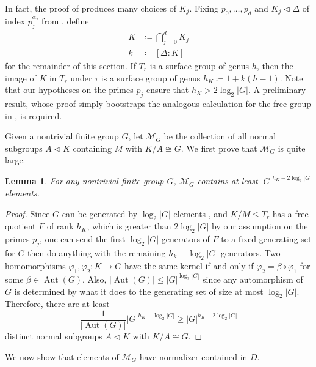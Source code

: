 \documentclass[11pt]{article}
\theoremstyle{plain}
\newtheorem{lem}[thm]{Lemma}
\theoremstyle{definition}
\theoremstyle{remark}
\newcommand{\calM}{\mathcal{M}}
\newcommand{\al}{\alpha}
\newcommand{\Del}{\Delta}
\DeclareMathOperator{\Aut}{Aut}
\newenvironment{pf}{\begin{proof}}{\end{proof}}
\begin{document}
In fact, the proof of  produces many choices of $K_j$. Fixing $p_0, \dots, p_d$ and $K_j \triangleleft \Del$ of index $p_j^{\al_j}$ from , define
\begin{align}
K &\coloneqq \bigcap_{j = 0}^d K_j \label{eq:KDef} \\
k &\coloneqq [\Del : K] \label{eq:kDef}
\end{align}
for the remainder of this section. If $T_r$ is a surface group of genus $h$, then the image of $K$ in $T_r$ under $\tau$ is a surface group of genus $h_K \coloneqq 1 + k(h - 1)$. Note that our hypotheses on the primes $p_j$ ensure that $h_K > 2 \log_2\!|G|$. A preliminary result, whose proof simply bootstraps the analogous calculation for the free group in \cite[\S 4]{BelolipetskyLubotzky}, is required.

Given a nontrivial finite group $G$, let $\calM_G$ be the collection of all normal subgroups $A \triangleleft K$ containing $M$ with $K/A \cong G$. We first prove that $\calM_G$ is quite large.

\begin{lem}\label{lem:SurfaceToG}
For any nontrivial finite group $G$, $\calM_G$ contains at least $|G|^{h_K - 2 \log_2 |G|}$ elements.
\end{lem}
\begin{pf}
Since $G$ can be generated by $\log_2\! |G|$ elements \cite[Lem.\ 1.2.2]{LubotzkySegal}, and $K/M \le T_r$ has a free quotient $F$ of rank $h_K$, which is greater than $2 \log_2\! |G|$ by our assumption on the primes $p_j$, one can send the first $\log_2\! |G|$ generators of $F$ to a fixed generating set for $G$ then do anything with the remaining $h_k - \log_2\! |G|$ generators. Two homomorphisms $\varphi_1, \varphi_2 : K \to G$ have the same kernel if and only if $\varphi_2 = \beta \circ \varphi_1$ for some $\beta \in \Aut(G)$. Also, ${|\Aut(G)| \le |G|^{\log_2\! |G|}}$ since any automorphism of $G$ is determined by what it does to the generating set of size at most $\log_2\! |G|$. Therefore, there are at least
\begin{equation}\label{eq:AutSizeBound}
\frac{1}{|\Aut(G)|} |G|^{h_K - \log_2\! |G|} \ge |G|^{h_K - 2 \log_2\! |G|}
\end{equation}
distinct normal subgroups $A \triangleleft K$ with $K/A \cong G$.
\end{pf}

We now show that elements of $\calM_G$ have normalizer contained in $D$.
\end{document}
